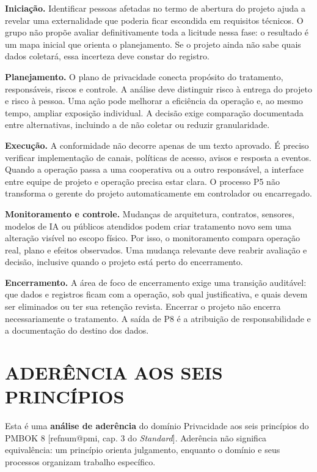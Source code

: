 \documentclass[12pt,a4paper,article,oneside,english,brazil]{abntex2}
\makeatletter
\newcommand{\refnum}[1]{\csname refnum@#1\endcsname}
\makeatother
\begin{document}
\textbf{Iniciação.} Identificar pessoas afetadas no termo de abertura do projeto ajuda a revelar uma externalidade que poderia ficar escondida em requisitos técnicos. O grupo não propõe avaliar definitivamente toda a licitude nessa fase: o resultado é um mapa inicial que orienta o planejamento. Se o projeto ainda não sabe quais dados coletará, essa incerteza deve constar do registro.

\textbf{Planejamento.} O plano de privacidade conecta propósito do tratamento, responsáveis, riscos e controle. A análise deve distinguir risco à entrega do projeto e risco à pessoa. Uma ação pode melhorar a eficiência da operação e, ao mesmo tempo, ampliar exposição individual. A decisão exige comparação documentada entre alternativas, incluindo a de não coletar ou reduzir granularidade.

\textbf{Execução.} A conformidade não decorre apenas de um texto aprovado. É preciso verificar implementação de canais, políticas de acesso, avisos e resposta a eventos. Quando a operação passa a uma cooperativa ou a outro responsável, a interface entre equipe de projeto e operação precisa estar clara. O processo P5 não transforma o gerente do projeto automaticamente em controlador ou encarregado.

\textbf{Monitoramento e controle.} Mudanças de arquitetura, contratos, sensores, modelos de IA ou públicos atendidos podem criar tratamento novo sem uma alteração visível no escopo físico. Por isso, o monitoramento compara operação real, plano e efeitos observados. Uma mudança relevante deve reabrir avaliação e decisão, inclusive quando o projeto está perto do encerramento.

\textbf{Encerramento.} A área de foco de encerramento exige uma transição auditável: que dados e registros ficam com a operação, sob qual justificativa, e quais devem ser eliminados ou ter sua retenção revista. Encerrar o projeto não encerra necessariamente o tratamento. A saída de P8 é a atribuição de responsabilidade e a documentação do destino dos dados.

\section{ADERÊNCIA AOS SEIS PRINCÍPIOS}

Esta é uma \textbf{análise de aderência} do domínio Privacidade aos seis princípios do PMBOK 8 [\refnum{pmi}, cap. 3 do \textit{Standard}]. Aderência não significa equivalência: um princípio orienta julgamento, enquanto o domínio e seus processos organizam trabalho específico.
\end{document}

